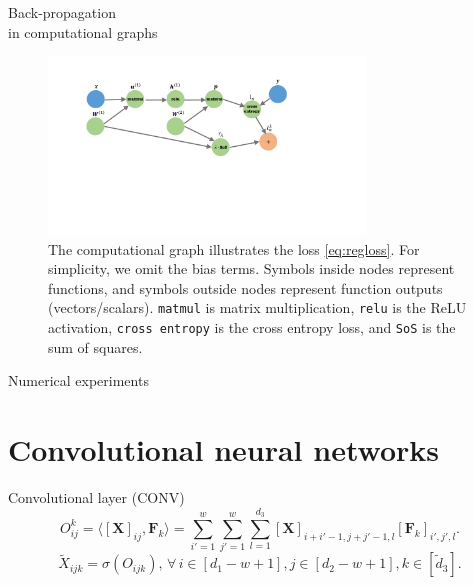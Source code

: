 \documentclass[presentation]{beamer}
\begin{document}
\begin{frame}{Back-propagation\\ in computational graphs}
    \begin{figure}[t]
        \centering
        \includegraphics[width=0.75\textwidth]{compuGraph2}\caption{The computational graph illustrates the loss \eqref{eq:regloss}. For simplicity, we omit the bias terms. Symbols inside nodes represent functions, and symbols outside nodes represent function outputs (vectors/scalars). {\normalfont \texttt{matmul}} is matrix multiplication, {\normalfont \texttt{relu}} is the ReLU activation, {\normalfont \texttt{cross entropy}} is the cross entropy loss, and {\normalfont \texttt{SoS}} is the sum of squares.} \label{fig:comgraph}
    \end{figure}
\end{frame}


\begin{frame}{Numerical experiments}
    
\end{frame}

\section{Convolutional neural networks}


\begin{frame}{Convolutional layer (CONV)}
    \begin{equation}\label{eq:conv}
        O^{k}_{ij}= \big\langle \left[\bm{X}\right]_{ij}, \bm{F}_{k} \big\rangle = \sum_{i'=1}^w \sum_{j'=1}^w \sum_{l=1}^{d_3} [\bm{X}]_{i+i'-1, j+j'-1, l} [\bm{F}_{k}]_{i',j',l}.
    \end{equation}
    \pause
    \begin{equation}\label{eq:relu}
    \tilde{X}_{ijk} = \sigma(O_{ijk}), \, \forall\, i \in [d_1-w+1], j \in [d_2-w+1], k \in [\tilde d_3].
    \end{equation}
\end{frame}
\end{document}
